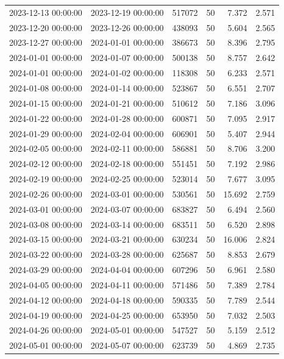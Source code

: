 \begin{tabular}{llrrrr}
2023-12-13 00:00:00 & 2023-12-19 00:00:00 & 517072 & 50 & 7.372 & 2.571 \\
2023-12-20 00:00:00 & 2023-12-26 00:00:00 & 438093 & 50 & 5.604 & 2.565 \\
2023-12-27 00:00:00 & 2024-01-01 00:00:00 & 386673 & 50 & 8.396 & 2.795 \\
2024-01-01 00:00:00 & 2024-01-07 00:00:00 & 500138 & 50 & 8.757 & 2.642 \\
2024-01-01 00:00:00 & 2024-01-02 00:00:00 & 118308 & 50 & 6.233 & 2.571 \\
2024-01-08 00:00:00 & 2024-01-14 00:00:00 & 523867 & 50 & 6.551 & 2.707 \\
2024-01-15 00:00:00 & 2024-01-21 00:00:00 & 510612 & 50 & 7.186 & 3.096 \\
2024-01-22 00:00:00 & 2024-01-28 00:00:00 & 600871 & 50 & 7.095 & 2.917 \\
2024-01-29 00:00:00 & 2024-02-04 00:00:00 & 606901 & 50 & 5.407 & 2.944 \\
2024-02-05 00:00:00 & 2024-02-11 00:00:00 & 586881 & 50 & 8.706 & 3.200 \\
2024-02-12 00:00:00 & 2024-02-18 00:00:00 & 551451 & 50 & 7.192 & 2.986 \\
2024-02-19 00:00:00 & 2024-02-25 00:00:00 & 523014 & 50 & 7.677 & 3.095 \\
2024-02-26 00:00:00 & 2024-03-01 00:00:00 & 530561 & 50 & 15.692 & 2.759 \\
2024-03-01 00:00:00 & 2024-03-07 00:00:00 & 683827 & 50 & 6.494 & 2.560 \\
2024-03-08 00:00:00 & 2024-03-14 00:00:00 & 683511 & 50 & 6.520 & 2.898 \\
2024-03-15 00:00:00 & 2024-03-21 00:00:00 & 630234 & 50 & 16.006 & 2.824 \\
2024-03-22 00:00:00 & 2024-03-28 00:00:00 & 625687 & 50 & 8.853 & 2.679 \\
2024-03-29 00:00:00 & 2024-04-04 00:00:00 & 607296 & 50 & 6.961 & 2.580 \\
2024-04-05 00:00:00 & 2024-04-11 00:00:00 & 571486 & 50 & 7.389 & 2.784 \\
2024-04-12 00:00:00 & 2024-04-18 00:00:00 & 590335 & 50 & 7.789 & 2.544 \\
2024-04-19 00:00:00 & 2024-04-25 00:00:00 & 653950 & 50 & 7.032 & 2.503 \\
2024-04-26 00:00:00 & 2024-05-01 00:00:00 & 547527 & 50 & 5.159 & 2.512 \\
2024-05-01 00:00:00 & 2024-05-07 00:00:00 & 623739 & 50 & 4.869 & 2.735 \\

\end{tabular}
